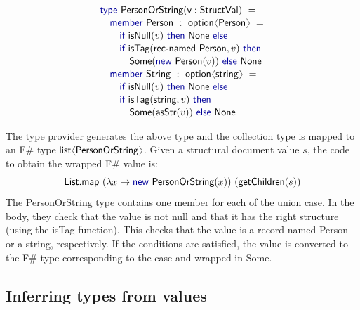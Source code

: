\documentclass[10pt,preprint,clearpagebib]{sigplanconf}
\newcommand{\langl}{\begin{picture}(4.5,7)
\put(1.1,2.5){\rotatebox{60}{\line(1,0){5.5}}}
\put(1.1,2.5){\rotatebox{300}{\line(1,0){5.5}}}
\end{picture}}
\newcommand{\rangl}{\begin{picture}(4.5,7)
\put(.9,2.5){\rotatebox{120}{\line(1,0){5.5}}}
\put(.9,2.5){\rotatebox{240}{\line(1,0){5.5}}}
\end{picture}}
\newcommand{\kvd}[1]{\textnormal{\textcolor{kvdclr}{\sffamily #1}}}
\newcommand{\ident}[1]{\textnormal{\sffamily #1}}
\begin{document}
\noindent
\begin{equation*}
\begin{array}{l}
 \kvd{type}~\ident{PersonOrString}(\ident{v}:\ident{StructVal})~= \\[0.1em]
 \quad \kvd{member}~\ident{Person}~:~\ident{option}\langl\ident{Person}\rangl~= \\[0.1em]
 \qquad \kvd{if}~\ident{isNull}(v)~\kvd{then}~\ident{None}~\kvd{else} \\[0.1em]
 \qquad \kvd{if}~\ident{isTag}(\ident{rec-named Person}, v)~\kvd{then}~\\[0.1em]
 \qquad\quad \ident{Some}(\kvd{new}~\ident{Person}(v))~\kvd{else}~\ident{None} \\[0.1em]
 \quad \kvd{member}~\ident{String}~:~\ident{option}\langl\ident{string}\rangl~= \\[0.1em]
 \qquad \kvd{if}~\ident{isNull}(v)~\kvd{then}~\ident{None}~\kvd{else} \\[0.1em]
 \qquad \kvd{if}~\ident{isTag}(\ident{string}, v)~\kvd{then}~\\[0.1em]
 \qquad\quad \ident{Some}(\ident{asStr}(v))~\kvd{else}~\ident{None}
\end{array}
\end{equation*}

\noindent
The type provider generates the above type and the collection type is mapped to an F\# type 
$\ident{list}\langl\ident{PersonOrString}\rangl$. Given a structural document value $s$, the code
to obtain the wrapped F\# value is:
%
\begin{equation*}
\ident{List.map}~(\lambda x\rightarrow\kvd{new}~\ident{PersonOrString}(x))~(\ident{getChildren}(s))
\end{equation*}
%
The \ident{PersonOrString} type contains one member for each of the union case. In the body, they
check that the value is not \kvd{null} and that it has the right structure (using the \ident{isTag}
function). This checks that the value is a record named \ident{Person} or a string, respectively.
If the conditions are satisfied, the value is converted to the F\# type corresponding to the case
and wrapped in \ident{Some}.


\subsection{Inferring types from values}
\label{sec:formal-inferval}
\end{document}
